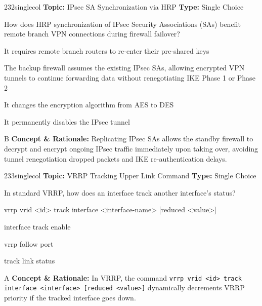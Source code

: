 \begin{qcard}{232}{singlecol}
\textcolor{darkslate!75}{\small\textbf{Topic:} IPsec SA Synchronization via HRP \hfill \textbf{Type:} Single Choice}\vspace{0.4em}\par
How does HRP synchronization of IPsec Security Associations (SAs) benefit remote branch VPN connections during firewall failover?
\begin{qoptions}
\item It requires remote branch routers to re-enter their pre-shared keys
\item The backup firewall assumes the existing IPsec SAs, allowing encrypted VPN tunnels to continue forwarding data without renegotiating IKE Phase 1 or Phase 2
\item It changes the encryption algorithm from AES to DES
\item It permanently disables the IPsec tunnel
\end{qoptions}
\end{qcard}
\nopagebreak
\begin{explainbox}{B}
\textbf{Concept \& Rationale:} Replicating IPsec SAs allows the standby firewall to decrypt and encrypt ongoing IPsec traffic immediately upon taking over, avoiding tunnel renegotiation dropped packets and IKE re-authentication delays.
\end{explainbox}

\begin{qcard}{233}{singlecol}
\textcolor{darkslate!75}{\small\textbf{Topic:} VRRP Tracking Upper Link Command \hfill \textbf{Type:} Single Choice}\vspace{0.4em}\par
In standard VRRP, how does an interface track another interface's status?
\begin{qoptions}
\item vrrp vrid \textless{}id\textgreater{} track interface \textless{}interface-name\textgreater{} [reduced \textless{}value\textgreater{}]
\item interface track enable
\item vrrp follow port
\item track link status
\end{qoptions}
\end{qcard}
\nopagebreak
\begin{explainbox}{A}
\textbf{Concept \& Rationale:} In VRRP, the command \texttt{vrrp vrid \textless{}id\textgreater{} track interface \textless{}interface\textgreater{} [reduced \textless{}value\textgreater{}]} dynamically decrements VRRP priority if the tracked interface goes down.
\end{explainbox}

